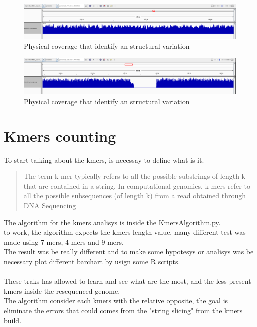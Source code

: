  \begin{figure}[H]
				\centering
				\includegraphics[scale=0.6]{immagini/sequence_coverage_2.png}
				\caption{Physical coverage that identify an structural variation}\label{fig:10}
				\end{figure}
				
				
				
 \begin{figure}[H]
				\centering
				\includegraphics[scale=0.6]{immagini/sequence_coverage_3.png}
				\caption{Physical coverage that identify an structural variation}\label{fig:11}
				\end{figure}	
\section{Kmers counting}
To start talking about the kmers, is necessay to define what is it.
\begin{quote}
The term k-mer typically refers to all the possible substrings of length k that are contained in a string. In computational genomics, k-mers refer to all the possible subsequences (of length k) from a read obtained through DNA Sequencing
\end{quote}

The algorithm for the kmers analisys is inside the KmersAlgorithm.py.\\
to work, the algorithm expects the kmers length value, many different test was made using 7-mers, 4-mers and 9-mers.\\
The result was be really different and to make some hypotesys or analisys was be necessary plot different barchart by usign some R scripts.\\\\

These traks has allowed to learn and see what are the most, and the less present kmers inside the resequenced genome.\\

The algorithm consider each kmers with the relative opposite, the goal is eliminate the errors that could comes from the "string slicing" from the kmers build.\\\\

